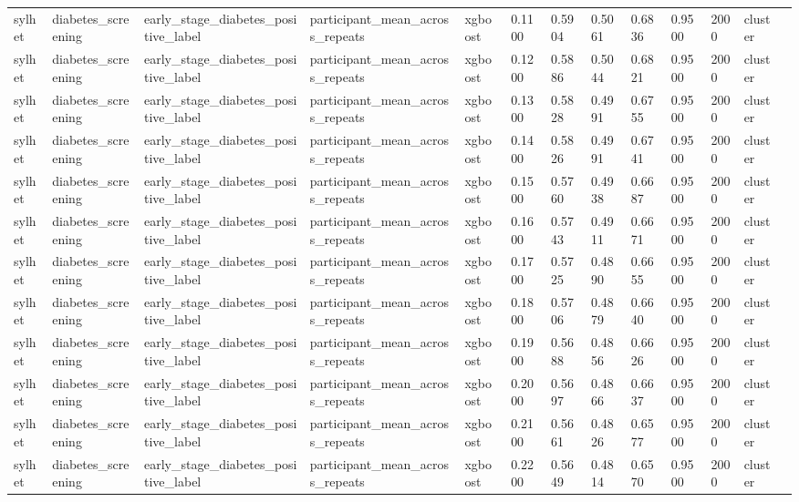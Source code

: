 \begin{tabular}{lllllllllllll}
sylhet & diabetes\_screening & early\_stage\_diabetes\_positive\_label & participant\_mean\_across\_repeats & xgboost & 0.1100 & 0.5904 & 0.5061 & 0.6836 & 0.9500 & 2000 & cluster &  \\
sylhet & diabetes\_screening & early\_stage\_diabetes\_positive\_label & participant\_mean\_across\_repeats & xgboost & 0.1200 & 0.5886 & 0.5044 & 0.6821 & 0.9500 & 2000 & cluster &  \\
sylhet & diabetes\_screening & early\_stage\_diabetes\_positive\_label & participant\_mean\_across\_repeats & xgboost & 0.1300 & 0.5828 & 0.4991 & 0.6755 & 0.9500 & 2000 & cluster &  \\
sylhet & diabetes\_screening & early\_stage\_diabetes\_positive\_label & participant\_mean\_across\_repeats & xgboost & 0.1400 & 0.5826 & 0.4991 & 0.6741 & 0.9500 & 2000 & cluster &  \\
sylhet & diabetes\_screening & early\_stage\_diabetes\_positive\_label & participant\_mean\_across\_repeats & xgboost & 0.1500 & 0.5760 & 0.4938 & 0.6687 & 0.9500 & 2000 & cluster &  \\
sylhet & diabetes\_screening & early\_stage\_diabetes\_positive\_label & participant\_mean\_across\_repeats & xgboost & 0.1600 & 0.5743 & 0.4911 & 0.6671 & 0.9500 & 2000 & cluster &  \\
sylhet & diabetes\_screening & early\_stage\_diabetes\_positive\_label & participant\_mean\_across\_repeats & xgboost & 0.1700 & 0.5725 & 0.4890 & 0.6655 & 0.9500 & 2000 & cluster &  \\
sylhet & diabetes\_screening & early\_stage\_diabetes\_positive\_label & participant\_mean\_across\_repeats & xgboost & 0.1800 & 0.5706 & 0.4879 & 0.6640 & 0.9500 & 2000 & cluster &  \\
sylhet & diabetes\_screening & early\_stage\_diabetes\_positive\_label & participant\_mean\_across\_repeats & xgboost & 0.1900 & 0.5688 & 0.4856 & 0.6626 & 0.9500 & 2000 & cluster &  \\
sylhet & diabetes\_screening & early\_stage\_diabetes\_positive\_label & participant\_mean\_across\_repeats & xgboost & 0.2000 & 0.5697 & 0.4866 & 0.6637 & 0.9500 & 2000 & cluster &  \\
sylhet & diabetes\_screening & early\_stage\_diabetes\_positive\_label & participant\_mean\_across\_repeats & xgboost & 0.2100 & 0.5661 & 0.4826 & 0.6577 & 0.9500 & 2000 & cluster &  \\
sylhet & diabetes\_screening & early\_stage\_diabetes\_positive\_label & participant\_mean\_across\_repeats & xgboost & 0.2200 & 0.5649 & 0.4814 & 0.6570 & 0.9500 & 2000 & cluster &  \\

\end{tabular}
